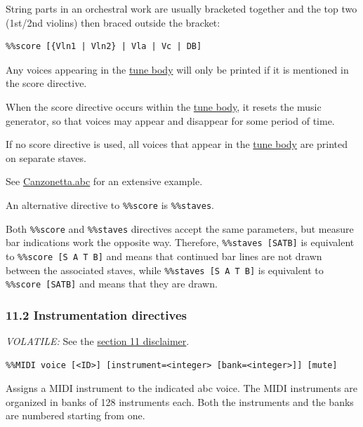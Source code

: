 \documentclass[oneside]{book}
\begin{document}
String parts in an orchestral work are usually bracketed together and
the top two (1st/2nd violins) then braced outside the bracket:

\begin{verbatim}
%%score [{Vln1 | Vln2} | Vla | Vc | DB]
\end{verbatim}

Any voices appearing in the
\protect\hyperlink{tune_body_definition}{tune body} will only be printed
if it is mentioned in the score directive.

When the score directive occurs within the
\protect\hyperlink{tune_body_definition}{tune body}, it resets the music
generator, so that voices may appear and disappear for some period of
time.

If no score directive is used, all voices that appear in the
\protect\hyperlink{tune_body_definition}{tune body} are printed on
separate staves.

See \protect\hyperlink{canzonettaabc}{Canzonetta.abc} for an extensive
example.

An alternative directive to \texttt{\%\%score} is \texttt{\%\%staves}.

Both \texttt{\%\%score} and \texttt{\%\%staves} directives accept the
same parameters, but measure bar indications work the opposite way.
Therefore, \texttt{\%\%staves\ {[}S\textbar{}A\textbar{}T\textbar{}B{]}}
is equivalent to \texttt{\%\%score\ {[}S\ A\ T\ B{]}} and means that
continued bar lines are not drawn between the associated staves, while
\texttt{\%\%staves\ {[}S\ A\ T\ B{]}} is equivalent to
\texttt{\%\%score\ {[}S\textbar{}A\textbar{}T\textbar{}B{]}} and means
that they are drawn.

\hypertarget{instrumentation_directives}{\subsubsection{11.2
Instrumentation directives}\label{instrumentation_directives}}

\emph{VOLATILE:} See the \protect\hyperlink{disclaimer}{section 11
disclaimer}.

\begin{verbatim}
%%MIDI voice [<ID>] [instrument=<integer> [bank=<integer>]] [mute]
\end{verbatim}

Assigns a MIDI instrument to the indicated abc voice. The MIDI
instruments are organized in banks of 128 instruments each. Both the
instruments and the banks are numbered starting from one.
\end{document}
